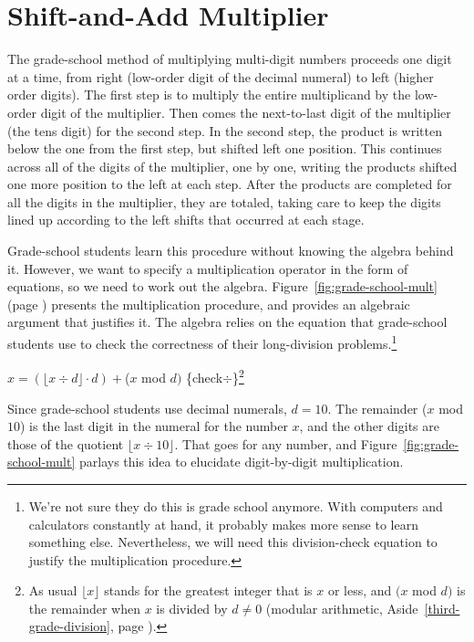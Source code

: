 \section{Shift-and-Add Multiplier}
\label{sec:bignum-mult}

The grade-school method of multiplying multi-digit numbers proceeds one digit at a time,
from right (low-order digit of the decimal numeral) to left (higher order digits).
The first step is to multiply the entire multiplicand by the low-order digit
of the multiplier.
Then comes the next-to-last digit of the multiplier (the tens digit) for the second step.
In the second step, the product is written below the one from the first step,
but shifted left one position.
This continues across all of the digits of the multiplier, one by one,
writing the products shifted one more position to the left at each step.
After the products are completed for
all the digits in the multiplier, they are totaled, taking care to keep
the digits lined up according to the left shifts that occurred at each stage.

Grade-school students learn this procedure
without knowing the algebra behind it.
However, we want to specify a
multiplication operator in the form of equations,
so we need to work out the algebra.
Figure~\ref{fig:grade-school-mult} (page \pageref{fig:grade-school-mult})
presents the multiplication procedure,
and provides an algebraic argument that justifies it.
The algebra relies on the equation
that grade-school students use to check the correctness of their long-division
problems.\footnote{We're not
sure they do this is grade school anymore.
With computers and calculators constantly at hand,
it probably makes more sense to learn something else.
Nevertheless, we will need this
division-check equation to justify the multiplication procedure.}

\hspace{2mm} $x = (\lfloor x \div d \rfloor \cdot d) + $($x$ mod $d)$ \hfill \{check$\div$\}\footnote{As
usual $\lfloor x\rfloor$ stands for the greatest integer that is $x$ or less,
and $(x$ mod $d)$ is the remainder when $x$ is divided by $d \neq 0$ (modular arithmetic,
Aside~\ref{third-grade-division}, page \pageref{third-grade-division}).}
\vspace{2mm}

Since grade-school students use decimal numerals,  $d = 10$.
The remainder ($x$ mod $10$) is the last digit in the numeral for the number $x$,
and the other digits are those of the quotient $\lfloor x \div 10 \rfloor$.
That goes for any number, and
Figure~\ref{fig:grade-school-mult}
parlays this idea to elucidate digit-by-digit multiplication.

